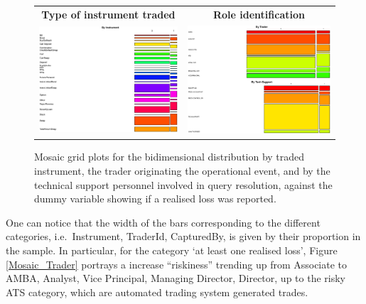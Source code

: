\documentclass[]{DissertateUSU}
\begin{document}
\begin{figure}
\begin{frame}
      \centering
       \begin{tabular}{cc}
        \textbf{Type of instrument traded} & \textbf{Role identification} \\
        \includegraphics[width=7.5cm]{Single_Instr.eps}
         &
         \includegraphics[width=7.5cm]{Stacked_TrId_TechSup.eps}
         \end{tabular}
    \end{frame}
    \caption{Mosaic grid plots for the bidimensional distribution by traded instrument, the trader originating the operational event, and by the technical support personnel involved in query resolution, against the dummy variable showing if a realised loss was reported.}
    \label{Mosaic_Instr_Trd_Tec}
\end{figure}

One can notice that the width of the bars corresponding to the different
categories, i.e.~Instrument, TraderId, CapturedBy, is given by their
proportion in the sample. In particular, for the category `at least one
realised loss', Figure \ref{Mosaic_Trader} portrays a increase
``riskiness'' trending up from Associate to AMBA, Analyst, Vice
Principal, Managing Director, Director, up to the risky ATS category,
which are automated trading system generated trades.\medskip
\end{document}
